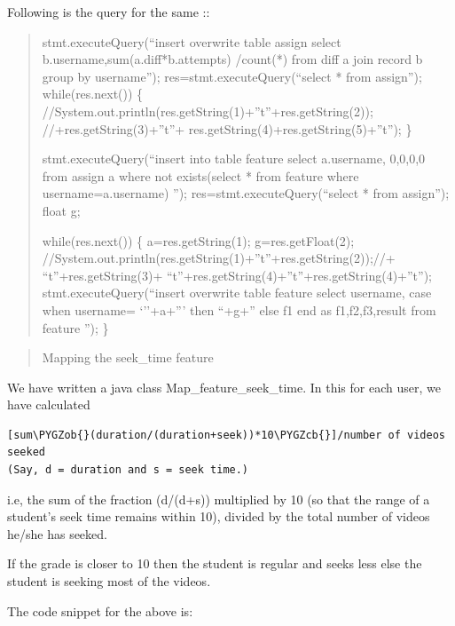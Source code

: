 \documentclass[a4paper,12pt,oneside]{sphinxmanual}
\def\PYGZob{\char`\{}
\def\PYGZcb{\char`\}}
\begin{document}
\begin{DUlineblock}{0em}
\item[] Following is the query for the same ::
\end{DUlineblock}
\begin{quote}

stmt.executeQuery(``insert overwrite table assign select
b.username,sum(a.diff*b.attempts)
/count(*) from diff a join record b group by username'');
res=stmt.executeQuery(``select * from assign'');
while(res.next())
\{
//System.out.println(res.getString(1)+''t''+res.getString(2));
//+res.getString(3)+''t''+
res.getString(4)+res.getString(5)+''t'');
\}

stmt.executeQuery(``insert into table feature select a.username,
0,0,0,0 from assign a where
not exists(select * from feature where username=a.username)   '');
res=stmt.executeQuery(``select * from assign'');
float g;

while(res.next())
\{
a=res.getString(1);
g=res.getFloat(2);
//System.out.println(res.getString(1)+''t''+res.getString(2));//+
``t''+res.getString(3)+
``t''+res.getString(4)+''t''+res.getString(4)+''t'');
stmt.executeQuery(``insert overwrite  table feature select username,
case when username=
`''+a+''' then ``+g+'' else f1 end as f1,f2,f3,result from feature '');
\}
\end{quote}
\begin{quote}\begin{description}
\item[{Mapping the seek\_time feature}] \leavevmode
\end{description}\end{quote}

We have written a java class Map\_feature\_seek\_time. In this for each user, we have calculated

\begin{Verbatim}[commandchars=\\\{\}]
[sum\PYGZob{}(duration/(duration+seek))*10\PYGZcb{}]/number of videos seeked
(Say, d = duration and s = seek time.)
\end{Verbatim}

i.e, the sum of the fraction (d/(d+s)) multiplied by 10 (so that the range of a student's seek time remains within 10), divided by the total number of videos he/she has seeked.

If the grade is closer to 10 then the student is regular and seeks less else the student is seeking most of the videos.

The code snippet for the above is:
\end{document}
